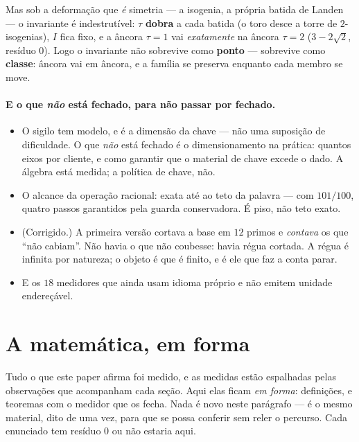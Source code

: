 \documentclass[11pt]{article}
\theoremstyle{plain}
\theoremstyle{remark}
\begin{document}
Mas sob a deformação que \emph{é} simetria --- a isogenia, a própria batida de Landen --- o invariante
é indestrutível: $\tau$ \textbf{dobra} a cada batida (o toro desce a torre de $2$-isogenias), $I$ fica
fixo, e a âncora $\tau=1$ vai \emph{exatamente} na âncora $\tau=2$ ($3-2\sqrt2$, resíduo $0$). Logo o
invariante não sobrevive como \textbf{ponto} --- sobrevive como \textbf{classe}: âncora vai em âncora,
e a família se preserva enquanto cada membro se move.

\paragraph{E o que \emph{não} está fechado, para não passar por fechado.}
\begin{itemize}\itemsep2pt
\item O sigilo tem modelo, e é a dimensão da chave --- não uma suposição de dificuldade. O que
\emph{não} está fechado é o dimensionamento na prática: quantos eixos por cliente, e como garantir
que o material de chave excede o dado. A álgebra está medida; a política de chave, não.
\item O alcance da operação racional: exata até ao teto da palavra --- com $101/100$, quatro passos
garantidos pela guarda conservadora. É piso, não teto exato.
\item (Corrigido.) A primeira versão cortava a base em $12$ primos e \emph{contava} os que ``não
cabiam''. Não havia o que não coubesse: havia régua cortada. A régua é infinita por natureza; o
objeto é que é finito, e é ele que faz a conta parar.
\item E os $18$ medidores que ainda usam idioma próprio e não emitem unidade endereçável.
\end{itemize}

\section{A matemática, em forma}

Tudo o que este paper afirma foi medido, e as medidas estão espalhadas pelas observações que
acompanham cada seção. Aqui elas ficam \emph{em forma}: definições, e teoremas com o medidor que os
fecha. Nada é novo neste parágrafo --- é o mesmo material, dito de uma vez, para que se possa conferir
sem reler o percurso. Cada enunciado tem resíduo $0$ ou não estaria aqui.
\end{document}
